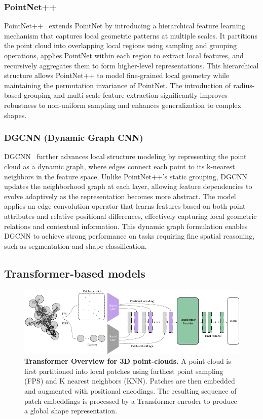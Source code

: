 \subsubsection{PointNet++}

PointNet++~\cite{pointnet++} extends PointNet by introducing a hierarchical feature learning mechanism that captures local geometric patterns at multiple scales. It partitions the point cloud into overlapping local regions using sampling and grouping operations, applies PointNet within each region to extract local features, and recursively aggregates them to form higher-level representations. This hierarchical structure allows PointNet++ to model fine-grained local geometry while maintaining the permutation invariance of PointNet. The introduction of radius-based grouping and multi-scale feature extraction significantly improves robustness to non-uniform sampling and enhances generalization to complex shapes.

\subsubsection{DGCNN (Dynamic Graph CNN)}

DGCNN~\cite{dgcnn} further advances local structure modeling by representing the point cloud as a dynamic graph, where edges connect each point to its k-nearest neighbors in the feature space. Unlike PointNet++’s static grouping, DGCNN updates the neighborhood graph at each layer, allowing feature dependencies to evolve adaptively as the representation becomes more abstract. The model applies an edge convolution operator that learns features based on both point attributes and relative positional differences, effectively capturing local geometric relations and contextual information. This dynamic graph formulation enables DGCNN to achieve strong performance on tasks requiring fine spatial reasoning, such as segmentation and shape classification.

\subsection{Transformer-based models}
\label{ssec:transformer_based_models}

\begin{figure}[t]
  \centering
  \includegraphics[width=1.0\linewidth]{figs/transformer_overview.pdf}
   \caption{\textbf{Transformer Overview for 3D point-clouds.} A point cloud is first partitioned into local patches using farthest point sampling (FPS) and K nearest neighbors (KNN). Patches are then embedded and augmented with positional encodings. The resulting sequence of patch embeddings is processed by a Transformer encoder to produce a global shape representation.}
   \label{fig:transformer-overview}
\end{figure}

